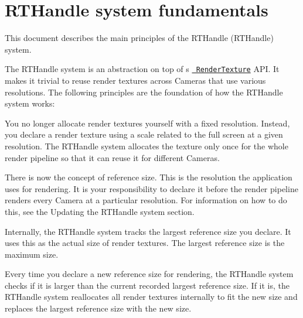 \chapter{RTHandle system fundamentals}
\hypertarget{md__hey_tea_9_2_library_2_package_cache_2com_8unity_8render-pipelines_8core_0d14_80_88_2_documen9dc7fefea40ec0f300e2f5293cf90ab5}{}\label{md__hey_tea_9_2_library_2_package_cache_2com_8unity_8render-pipelines_8core_0d14_80_88_2_documen9dc7fefea40ec0f300e2f5293cf90ab5}
\label{md__hey_tea_9_2_library_2_package_cache_2com_8unity_8render-pipelines_8core_0d14_80_88_2_documen9dc7fefea40ec0f300e2f5293cf90ab5_autotoc_md1842}%
%
 This document describes the main principles of the RTHandle (RTHandle) system.

The RTHandle system is an abstraction on top of \textquotesingle{}s \href{https://docs.unity3d.com/ScriptReference/RenderTexture.html}{\texttt{ Render\+Texture}} API. It makes it trivial to reuse render textures across Cameras that use various resolutions. The following principles are the foundation of how the RTHandle system works\+:


\begin{DoxyItemize}
\item You no longer allocate render textures yourself with a fixed resolution. Instead, you declare a render texture using a scale related to the full screen at a given resolution. The RTHandle system allocates the texture only once for the whole render pipeline so that it can reuse it for different Cameras.
\item There is now the concept of reference size. This is the resolution the application uses for rendering. It is your responsibility to declare it before the render pipeline renders every Camera at a particular resolution. For information on how to do this, see the Updating the RTHandle system section.
\item Internally, the RTHandle system tracks the largest reference size you declare. It uses this as the actual size of render textures. The largest reference size is the maximum size.
\item Every time you declare a new reference size for rendering, the RTHandle system checks if it is larger than the current recorded largest reference size. If it is, the RTHandle system reallocates all render textures internally to fit the new size and replaces the largest reference size with the new size.
\end{DoxyItemize}

